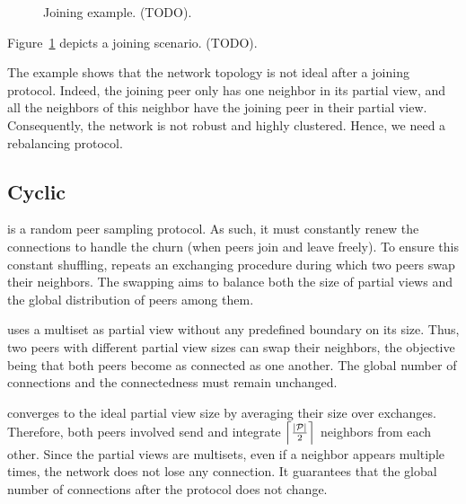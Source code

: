\begin{figure}
  \centering
  
  \caption{\label{fig:joiningexample}Joining example. (TODO).}
\end{figure}

Figure~\ref{fig:joiningexample} depicts a joining scenario. (TODO).

The example shows that the network topology is not ideal after a joining
protocol. Indeed, the joining peer only has one neighbor in its partial view,
and all the neighbors of this neighbor have the joining peer in their partial
view. Consequently, the network is not robust and highly clustered. Hence, we
need a rebalancing protocol.

\subsection{Cyclic}

\SCAMPLON{} is a random peer sampling protocol. As such, it must constantly
renew the connections to handle the churn (when peers join and leave freely).
To ensure this constant shuffling, \SCAMPLON{} repeats an exchanging procedure
during which two peers swap their neighbors. The swapping aims to balance both
the size of partial views and the global distribution of peers among them.

\SCAMPLON{} uses a multiset as partial view without any predefined boundary on
its size. Thus, two peers with different partial view sizes can swap their
neighbors, the objective being that both peers become as connected as one
another. The global number of connections and the connectedness must remain
unchanged.

\SCAMPLON{} converges to the ideal partial view size by averaging their size
over exchanges. Therefore, both peers involved send and integrate
$\left\lceil|\mathcal{P}|\over{2}\right\rceil$ neighbors from each
other. Since the partial views are multisets, even if a neighbor appears
multiple times, the network does not lose any connection. It guarantees that
the global number of connections after the protocol does not change.

